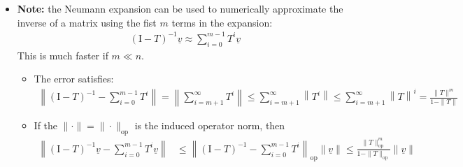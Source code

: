 \documentclass[11pt,twoside]{report}
\newcommand{\vecnot}{\underline}
\newcommand{\Id}{{\mathrm{I}}}
\begin{document}
\begin{itemize}
\begin{itemize}
\item Thus, $\sum_{i=0}^{\infty} T^i$ is a right inverse for $I-T$ 

\item Same argument works on the left, so we're done. \hfill \qedhere

\end{itemize}

\item \textbf{Note:} the  Neumann expansion can be used to numerically approximate the inverse of a matrix using the fist $m$ terms in the expansion: 
\begin{align*}
( \Id - T)^{-1}\vecnot{v}  \approx \sum_{i=0}^{m-1} T^i \vecnot{v} 
\end{align*}
This is much faster if $m \ll n$. 
\begin{itemize}
\item The error satisfies: 
\begin{align*}
 \left\| ( \Id - T)^{-1}-  \sum_{i=0}^{m-1}  T^i   \right \|    =  \left\| \sum_{i =m+1}^\infty  T^i   \right \|    \le  \sum_{i =m+1}^\infty   \left\|  T^i   \right \|   \le  \sum_{i =m+1}^\infty   \left\|  T   \right \|^i 
 =   \frac{ \|T\|^m}{ 1- \|T\|}
 \end{align*}
\item If the $\|\cdot\| = \|\cdot\|_\mathrm{op}$ is the induced operator norm, then 
\begin{align*}
\left\| ( \Id - T)^{-1} \vecnot{v} -  \sum_{i=0}^{m-1} T^i \vecnot{v}  \right \| &    \le \left\| ( \Id - T)^{-1}-  \sum_{i=0}^{m-1}  T^i   \right \|_\mathrm{op}   \| \vecnot{v} \| \le   \frac{ \|T\|_\mathrm{op}^m}{ 1- \|T\|_\mathrm{op} } \| \vecnot{v} \|
\end{align*}
\end{itemize} 




\end{itemize}



 
\end{document}
